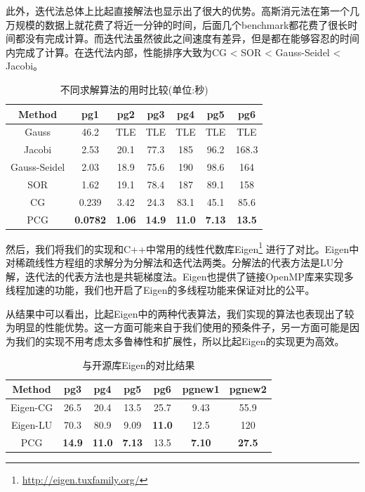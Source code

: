 \documentclass[UTF8,11pt]{report}
\begin{document}
此外，迭代法总体上比起直接解法也显示出了很大的优势。高斯消元法在第一个几万规模的数据上就花费了将近一分钟的时间，后面几个benchmark都花费了很长时间都没有完成计算。而迭代法虽然彼此之间速度有差异，但是都在能够容忍的时间内完成了计算。在迭代法内部，性能排序大致为CG < SOR < Gauss-Seidel < Jacobi。

\begin{table}[!ht]
	\centering
	\caption{不同求解算法的用时比较(单位:秒)}
	\label{tab:algorithm_result}
	\begin{tabular}{c|c|c|c|c|c|c}
	\toprule
	Method & pg1 & pg2 & pg3 & pg4 & pg5 & pg6\\
	\midrule
	Gauss & 46.2 & TLE & TLE & TLE & TLE & TLE\\
	Jacobi & 2.53 & 20.1 & 77.3 & 185 & 96.2 & 168.3\\
	Gauss-Seidel & 2.03 & 18.9 & 75.6 & 190 & 98.6 & 164\\
	SOR & 1.62 & 19.1 & 78.4 & 187 & 89.1 & 158\\
	CG & 0.239 & 3.42 & 24.3 & 83.1 & 45.1 & 85.6\\
	PCG & \textbf{0.0782} & \textbf{1.06} & \textbf{14.9} & \textbf{11.0} & \textbf{7.13} & \textbf{13.5}\\
	\bottomrule
	\end{tabular}
\end{table}

然后，我们将我们的实现和C++中常用的线性代数库Eigen\footnote{\url{http://eigen.tuxfamily.org/}} 进行了对比。Eigen中对稀疏线性方程组的求解分为分解法和迭代法两类。分解法的代表方法是LU分解，迭代法的代表方法也是共轭梯度法。Eigen也提供了链接OpenMP库来实现多线程加速的功能，我们也开启了Eigen的多线程功能来保证对比的公平。

从结果中可以看出，比起Eigen中的两种代表算法，我们实现的算法也表现出了较为明显的性能优势。这一方面可能来自于我们使用的预条件子，另一方面可能是因为我们的实现不用考虑太多鲁棒性和扩展性，所以比起Eigen的实现更为高效。

\begin{table}[!ht]
	\centering
	\caption{与开源库Eigen的对比结果}
	\begin{tabular}{c|c|c|c|c|c|c}
	\toprule
	Method & pg3 & pg4 & pg5 & pg6 & pgnew1 & pgnew2\\
	\midrule
	Eigen-CG & 26.5 & 20.4 & 13.5 & 25.7 & 9.43 & 55.9\\
	Eigen-LU & 70.3 & 80.9 & 9.09 & \textbf{11.0} & 12.5 & 120\\
	\midrule
	PCG & \textbf{14.9} & \textbf{11.0} & \textbf{7.13} & 13.5 & \textbf{7.10} & \textbf{27.5}\\
	\bottomrule
	\end{tabular}
\end{table}
\end{document}
